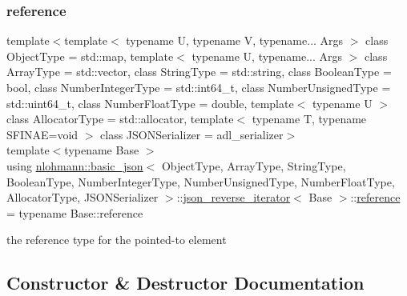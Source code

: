 \subsubsection{\texorpdfstring{reference}{reference}}
{\footnotesize\ttfamily template$<$template$<$ typename U, typename V, typename... Args $>$ class Object\+Type = std\+::map, template$<$ typename U, typename... Args $>$ class Array\+Type = std\+::vector, class String\+Type  = std\+::string, class Boolean\+Type  = bool, class Number\+Integer\+Type  = std\+::int64\+\_\+t, class Number\+Unsigned\+Type  = std\+::uint64\+\_\+t, class Number\+Float\+Type  = double, template$<$ typename U $>$ class Allocator\+Type = std\+::allocator, template$<$ typename T, typename S\+F\+I\+N\+A\+E=void $>$ class J\+S\+O\+N\+Serializer = adl\+\_\+serializer$>$ \\
template$<$typename Base $>$ \\
using \mbox{\hyperlink{classnlohmann_1_1basic__json}{nlohmann\+::basic\+\_\+json}}$<$ Object\+Type, Array\+Type, String\+Type, Boolean\+Type, Number\+Integer\+Type, Number\+Unsigned\+Type, Number\+Float\+Type, Allocator\+Type, J\+S\+O\+N\+Serializer $>$\+::\mbox{\hyperlink{classnlohmann_1_1basic__json_1_1json__reverse__iterator}{json\+\_\+reverse\+\_\+iterator}}$<$ Base $>$\+::\mbox{\hyperlink{classnlohmann_1_1basic__json_1_1json__reverse__iterator_ab0021ef2007fd338615360af404dcd4e}{reference}} =  typename Base\+::reference}



the reference type for the pointed-\/to element 



\subsection{Constructor \& Destructor Documentation}
\mbox{\label{classnlohmann_1_1basic__json_1_1json__reverse__iterator_a1270fe04d4801caf51e7464273305ba8}} 

